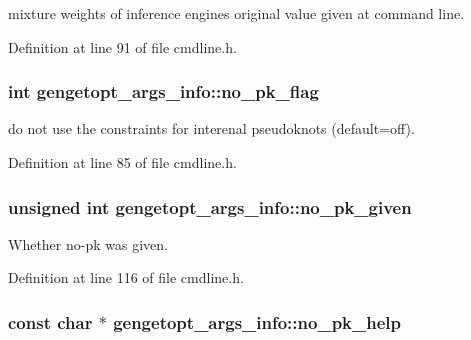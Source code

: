 mixture weights of inference engines original value given at command line. 



Definition at line 91 of file cmdline.\+h.

\hypertarget{structgengetopt__args__info_a656b35ad9dd3f8f39444ec2684fcf47c}{
\subsubsection[{no\+\_\+pk\+\_\+flag}]{\setlength{\rightskip}{0pt plus 5cm}int gengetopt\+\_\+args\+\_\+info\+::no\+\_\+pk\+\_\+flag}}\label{structgengetopt__args__info_a656b35ad9dd3f8f39444ec2684fcf47c}


do not use the constraints for interenal pseudoknots (default=off). 



Definition at line 85 of file cmdline.\+h.

\hypertarget{structgengetopt__args__info_a6aa44a52828faad6c6d8ec6b4ab5494e}{
\subsubsection[{no\+\_\+pk\+\_\+given}]{\setlength{\rightskip}{0pt plus 5cm}unsigned int gengetopt\+\_\+args\+\_\+info\+::no\+\_\+pk\+\_\+given}}\label{structgengetopt__args__info_a6aa44a52828faad6c6d8ec6b4ab5494e}


Whether no-\/pk was given. 



Definition at line 116 of file cmdline.\+h.

\hypertarget{structgengetopt__args__info_ab2409525071e5bcc073637b7e252fea8}{
\subsubsection[{no\+\_\+pk\+\_\+help}]{\setlength{\rightskip}{0pt plus 5cm}const char $\ast$ gengetopt\+\_\+args\+\_\+info\+::no\+\_\+pk\+\_\+help}}\label{structgengetopt__args__info_ab2409525071e5bcc073637b7e252fea8}


